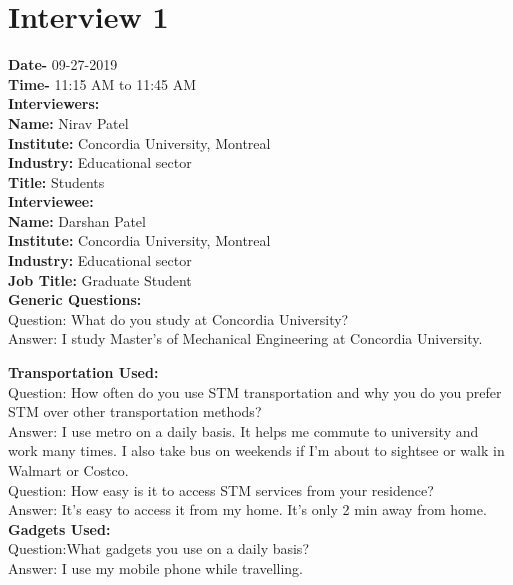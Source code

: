 \documentclass[11pt, english]{report}
\begin{document}
\section{Interview 1}
\textbf{Date-} 09-27-2019\\
\textbf{Time-} 11:15 AM to 11:45 AM\\
\textbf{Interviewers:}\\

\textbf{Name:} Nirav Patel \\
\textbf{Institute:} Concordia University, Montreal \\
\textbf{Industry:} Educational sector\\
\textbf{Title:} Students \\ 

\textbf{Interviewee:}\\

\textbf{Name:} Darshan Patel \\
\textbf{Institute:} Concordia University, Montreal \\
\textbf{Industry:} Educational sector\\
\textbf{Job Title:} Graduate Student\\ 


\textbf{Generic Questions:}\\

Question: What do you study at Concordia University? \\
Answer: I study Master's of Mechanical Engineering at Concordia University.

\textbf{Transportation Used:}\\

Question: How often do you use STM transportation and why you do you prefer STM over other transportation methods?\\
Answer: I use metro on a daily basis. It helps me commute to university and work many times. I also take bus on weekends if I’m about to sightsee or walk in Walmart or Costco.\\

Question: How easy is it to access STM services from your residence?\\
Answer: It's easy to access it from my home. It's only 2 min away from home.\\

\textbf{Gadgets Used:}\\

Question:What gadgets you use on a daily basis?\\
Answer: I use my mobile phone while travelling.\\
\end{document}
